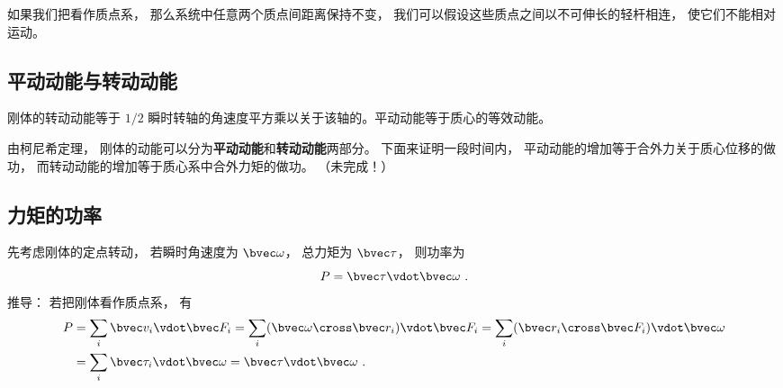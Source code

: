 
\begin{issues}
\issueDraft
\end{issues}


如果我们把看作质点系， 那么系统中任意两个质点间距离保持不变， 我们可以假设这些质点之间以不可伸长的轻杆相连， 使它们不能相对运动。

\subsection{平动动能与转动动能}

刚体的转动动能等于 $1/2$ 瞬时转轴的角速度平方乘以关于该轴的。平动动能等于质心的等效动能。

由柯尼希定理， 刚体的动能可以分为\textbf{平动动能}和\textbf{转动动能}两部分。 下面来证明一段时间内， 平动动能的增加等于合外力关于质心位移的做功， 而转动动能的增加等于质心系中合外力矩的做功。
（未完成！）

\subsection{力矩的功率}
先考虑刚体的定点转动， 若瞬时角速度为 $\bvec \omega$， 总力矩为 $\bvec \tau$， 则功率为
\begin{equation}
P = \bvec \tau\vdot \bvec \omega~.
\end{equation}
推导： 若把刚体看作质点系， 有
\begin{equation}
\begin{aligned}
P &= \sum_i \bvec v_i \vdot \bvec F_i
= \sum_i (\bvec \omega \cross \bvec r_i) \vdot \bvec F_i
= \sum_i (\bvec r_i\cross\bvec F_i)\vdot \bvec \omega\\
&= \sum_i \bvec \tau_i \vdot \bvec \omega = \bvec \tau\vdot \bvec \omega~.
\end{aligned}
\end{equation}



